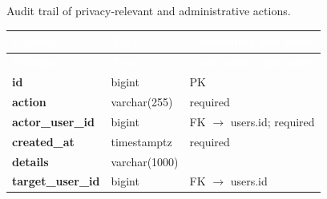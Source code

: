\subsection*{}
Audit trail of privacy-relevant and administrative actions.\par\vspace{2pt}
{\tabfont\rowband
\begin{longtable}{@{}>{\raggedright\arraybackslash}p{}>{\raggedright\arraybackslash}p{}>{\raggedright\arraybackslash}p{}@{}}
\rowcolor{najdanavy}\textcolor{white}{\sffamily\bfseries\small Column} & \textcolor{white}{\sffamily\bfseries\small Type} & \textcolor{white}{\sffamily\bfseries\small Constraints and notes}\\
\endfirsthead
\rowcolor{najdanavy}\textcolor{white}{\sffamily\bfseries\small Column} & \textcolor{white}{\sffamily\bfseries\small Type} & \textcolor{white}{\sffamily\bfseries\small Constraints and notes}\\
\endhead
\bottomrule\endlastfoot
\textbf{id} & bigint & PK\\
\textbf{action} & varchar(255) & required\\
\textbf{actor\_\allowbreak{}user\_\allowbreak{}id} & bigint & FK $\rightarrow$ users.id; required\\
\textbf{created\_\allowbreak{}at} & timestamptz & required\\
\textbf{details} & varchar(1000) & \\
\textbf{target\_\allowbreak{}user\_\allowbreak{}id} & bigint & FK $\rightarrow$ users.id\\
\end{longtable}}

